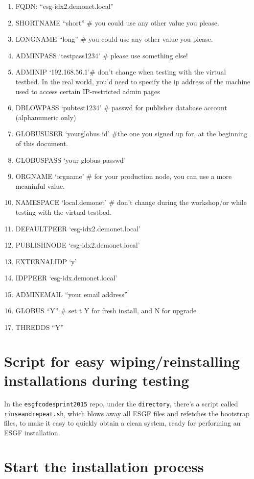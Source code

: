\begin{enumerate}
\def\labelenumi{\arabic{enumi}.}
\item
  FQDN: ``esg-idx2.demonet.local''
\item
  SHORTNAME ``short'' \# you could use any other value you please.
\item
  LONGNAME ``long'' \# you could use any other value you please.
\item
  ADMINPASS `testpass1234' \# please use something else!
\item
  ADMINIP `192.168.56.1'\# don't change when testing with the virtual testbed. In the real world, you'd need to specify the ip address of the machine used to access certain IP-restricted admin pages
\item
  DBLOWPASS `pubtest1234' \# passwd for publisher database account
  (alphanumeric only)
\item
  GLOBUSUSER `yourglobus id' \#the one you signed up for, at the
  beginning of this document.
\item
  GLOBUSPASS `your globus passwd'
\item
  ORGNAME `orgname' \# for your production node, you can use a more
  meaninful value.
\item
  NAMESPACE `local.demonet' \# don't change during the workshop/or while testing with the virtual testbed.
\item
  DEFAULTPEER `esg-idx2.demonet.local'
\item
  PUBLISHNODE `esg-idx2.demonet.local'
\item
  EXTERNALIDP `y'
\item
  IDPPEER `esg-idx.demonet.local'
\item
  ADMINEMAIL ``your email address''
\item
  GLOBUS ``Y'' \# set t Y for fresh install, and N for upgrade
\item
  THREDDS ``Y''
\end{enumerate}

\section{Script for easy wiping/reinstalling installations during testing}
In the \texttt{esgfcodesprint2015} repo, under the \texttt{directory}, there's a script called \texttt{rinseandrepeat.sh}, which blows away all ESGF files and refetches the bootstrap files, to make it easy to quickly obtain a clean system, ready for performing an ESGF installation.  
\section{Start the installation
process}\label{start-the-installation-process}

